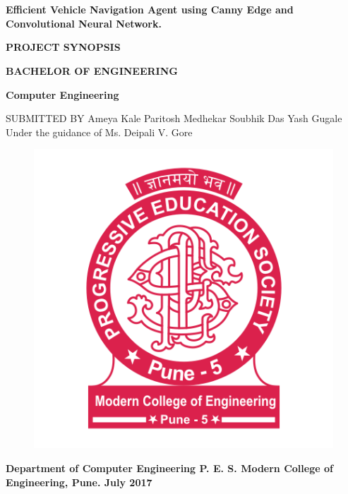 \documentclass[12pt,a4paper,final]{article}
\begin{document}
\section*{}
\begin{center}
\Huge
\textbf{
Efficient Vehicle Navigation Agent using Canny Edge and Convolutional Neural Network.
}

\vspace*{1.5cm}

\large
\textbf{
PROJECT SYNOPSIS
}

\vspace*{1.5cm}
\textbf{
BACHELOR OF ENGINEERING
}

\Large
\textbf{
Computer Engineering
}

\vspace*{1cm}
\large
SUBMITTED BY
\vspace*{1cm}
\linebreak
Ameya Kale
\linebreak
Paritosh Medhekar
\linebreak
Soubhik Das
\linebreak
Yash Gugale
\linebreak
\linebreak
Under the guidance of
\linebreak
Ms. Deipali V. Gore


\begin{figure}[h]
\begin{center}
\includegraphics[scale=0.8]{new_logo.png}
\end{center}
\end{figure}

\Large
\textbf{
Department of Computer Engineering
\linebreak
P. E. S. Modern College of Engineering,
\linebreak
Pune.
\linebreak
\linebreak
July 2017
}
\end{center}
\newpage
\end{document}
